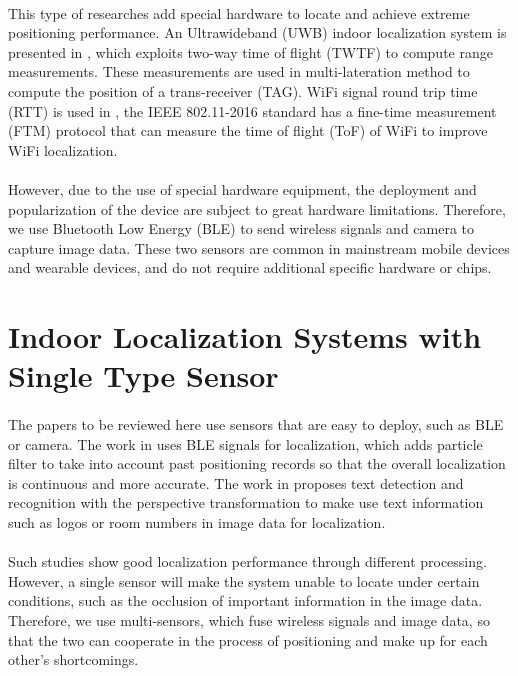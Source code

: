 \documentclass[a4paper,12pt]{report}
\begin{document}
\paragraph{}
This type of researches add special hardware to locate and achieve extreme positioning performance. An Ultrawideband (UWB) indoor localization system is presented in \cite{Dabove2018Indoor}, which exploits two-way time of flight (TWTF) to compute range measurements. These measurements are used in multi-lateration method to compute the position of a trans-receiver (TAG). WiFi signal round trip time (RTT) is used in \cite{Hashem2020WiNar}, the IEEE 802.11-2016 standard has a fine-time measurement (FTM) protocol that can measure the time of flight (ToF) of WiFi to improve WiFi localization.

\paragraph{}
However, due to the use of special hardware equipment, the deployment and popularization of the device are subject to great hardware limitations. Therefore, we use Bluetooth Low Energy (BLE) to send wireless signals and camera to capture image data. These two sensors are common in mainstream mobile devices and wearable devices, and do not require additional specific hardware or chips.
%

\section{Indoor Localization Systems with Single Type Sensor}

\paragraph{}
The papers to be reviewed here use sensors that are easy to deploy, such as BLE or camera. The work in \cite{Sou2019BTrack} uses BLE signals for localization, which adds particle filter to take into account past positioning records so that the overall localization is continuous and more accurate. The work in \cite{Li2021VideoLoc} proposes text detection and recognition with the perspective transformation to make use text information such as logos or room numbers in image data for localization.

\paragraph{}
Such studies show good localization performance through different processing. However, a single sensor will make the system unable to locate under certain conditions, such as the occlusion of important information in the image data. Therefore, we use multi-sensors, which fuse wireless signals and image data, so that the two can cooperate in the process of positioning and make up for each other's shortcomings.
\end{document}
